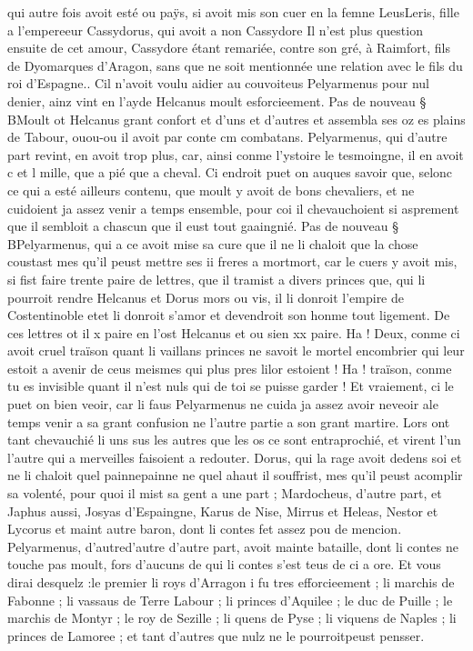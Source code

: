 \documentclass{article}
\begin{document}
\begin{pages}
   qui autre fois avoit esté ou paÿs, si avoit mis son cuer en la femne 
   LeusLeris, 
   fille a l’empereeur Cassydorus, qui avoit a non Cassydore
   Il n'est plus question ensuite de cet amour, Cassydore étant remariée, contre son gré, à Raimfort, 
   fils de Dyomarques d'Aragon, sans que ne soit mentionnée une relation avec le fils du roi d'Espagne.. 
   Cil n’avoit voulu aidier au couvoiteus Pelyarmenus pour nul denier, 
   ainz vint en l’ayde Helcanus moult esforcieement. \pend
\pstart Pas de nouveau § BMoult ot Helcanus 
   grant confort et d’uns et d’autres et assembla ses oz es plains de Tabour, 
   ouou-ou il avoit par conte 
   cm combatans. 
   Pelyarmenus, qui d’autre part revint, en avoit trop plus, car, 
   ainsi conme l’ystoire le tesmoingne, il en avoit c et l mille, que a pié que a cheval. 
   Ci endroit puet on auques savoir que, selonc ce qui a esté ailleurs contenu, que moult y avoit de bons chevaliers, 
   et ne cuidoient ja assez venir a temps ensemble, pour coi il chevauchoient si asprement 
   que il sembloit a chascun que il eust tout gaaingnié. \pend 
\pstart Pas de nouveau § BPelyarmenus, 
   qui a ce avoit mise sa cure que il ne li chaloit que la chose coustast mes qu’il peust mettre ses ii freres a 
   mortmort, car le cuers y avoit mis, si fist faire trente paire de lettres, 
   que il tramist a divers princes que, qui li pourroit rendre Helcanus 
   et Dorus mors ou vis, il li donroit l’empire de Costentinoble 
   etet li donroit s'amor et 
   devendroit son honme tout ligement. De ces lettres ot il x paire en l’ost Helcanus 
   et ou sien xx paire. Ha ! Deux, conme ci avoit cruel traïson quant li vaillans princes ne savoit le mortel encombrier qui 
   leur estoit a avenir de ceus meismes qui plus pres lilor estoient ! 
   Ha ! traïson, conme tu es invisible 
   quant il n’est nuls qui de toi se puisse garder ! Et vraiement, ci le puet on bien veoir, car li faus 
   Pelyarmenus ne cuida ja assez 
   avoir neveoir 
   ale temps venir 
   a sa grant confusion ne l’autre partie a son grant martire. Lors ont tant chevauchié li uns sus les autres que les os ce sont 
   entraprochié, et virent l’un l’autre qui a merveilles faisoient a 
   redouter. \pend
\pstart Dorus, qui la rage avoit dedens soi et ne li chaloit quel 
   painnepainne ne quel ahaut 
   il souffrist, mes qu’il peust acomplir sa volenté, pour quoi il mist sa gent a une part ; 
   Mardocheus, d’autre part, et 
   Japhus aussi, Josyas 
   d’Espaingne, 
   Karus de Nise, Mirrus et 
   Heleas, Nestor et Lycorus 
   et maint autre baron, dont li contes fet assez pou de mencion. 
   Pelyarmenus, d’autred'autre d'autre 
   part, avoit mainte bataille, 
   dont li contes ne touche pas moult, fors d’aucuns de qui li contes s’est teus de ci a ore. 
      Et vous dirai desquelz :le premier 
   li roys d’Arragon 
   i fu tres efforcieement ; 
   li marchis de Fabonne ; 
   li vassaus de Terre Labour ; 
   li princes d’Aquilee ; 
   le duc de Puille ; 
   le marchis de Montyr ; 
   le roy de Sezille ; 
   li quens de Pyse ; 
   li viquens de Naples ; 
   li princes de Lamoree ; 
   et tant d’autres que nulz ne le pourroitpeust pensser. \pend
         

\end{pages}
\end{document}
